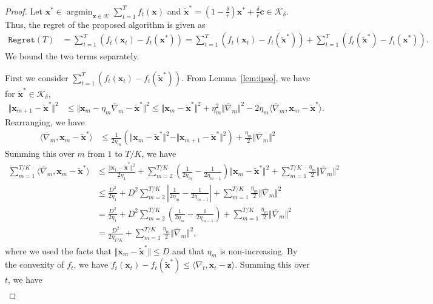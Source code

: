 \documentclass[twoside,11pt,]{article}
\newcommand{\op}[1]{\operatorname{#1}}
\newcommand{\C}[1]{\mathcal{#1}}
\newcommand{\BF}[1]{\mathbf{#1}}
\newcommand{\K}{\C{K}}
\newcommand{\x}{\BF{x}}
\newcommand{\xs}{\x^*}
\newcommand{\txs}{\tilde{\x}^*}
\newcommand{\z}{\BF{z}}
\newcommand{\sumT}{\sum\limits_{t=1}^T}
\newcommand{\bn}{\bar{\nabla}}
\begin{document}
\begin{proof}
Let $\xs\in \op{argmin}_{\x\in\K}\sum_{t=1}^T f_t(\x)$ and $\txs=(1-\frac{\delta}{r})\xs+\frac{\delta}{r}{\BF{c}} \in \K_\delta$.
Thus, the regret of the proposed algorithm is given as
\begin{align}
\label{eq:decomposeRegret}
\mathtt{Regret}(T) &= \sumT \left( f_t(\x_t) - f_t(\xs) \right) 
= \sumT \left( f_t(\x_t) - f_t(\txs) \right) + \sumT \left( f_t(\txs) - f_t(\xs) \right).
\end{align}
We bound the two terms separately.

First we consider $\sum_{t=1}^T \left( f_t(\x_t) - f_t(\txs) \right)$.
From Lemma~\ref{lem:ipso}, we have for $\txs \in \K_\delta$,
\begin{align*}
\Vert \x_{m+1}-\txs \Vert ^2 & \leq \Vert \x_m - \eta_m \bn_m -\txs \Vert ^2 
\leq \Vert \x_m - \txs \Vert ^2 + \eta_m^2 \Vert \bn_m \Vert^2 - 2\eta_m \langle \bn_m, \x_m - \txs \rangle.
\end{align*}
Rearranging, we have
\begin{align}
\langle \bn_m, \x_m - \txs \rangle 
&\leq \frac{1}{2\eta_m} (\Vert \x_m - \txs \Vert ^2- \Vert \x_{m+1}-\txs \Vert ^2) 
+ \frac{\eta_m}{2} \Vert \bn_m \Vert^2
\end{align}
Summing this over $m$ from $1$ to $T/K$, we have
\begin{align*}
\sum\limits_{m=1}^{T/K} \langle \bn_m , \x_m - \txs \rangle  
&\leq \frac{\Vert \x_1 - \txs \Vert ^2}{2\eta_1} 
+ \sum\limits_{m=2}^{T/K} (\frac{1}{2\eta_m}-\frac{1}{2\eta_{m-1}}) \Vert \x_m - \txs \Vert ^2 
+ \sum\limits_{m=1}^{T/K} \frac{\eta_m}{2} \Vert \bn_m \Vert^2 \\
&\leq \frac{D^2}{2\eta_1} 
+ D^2 \sum\limits_{m=2}^{T/K} \left| \frac{1}{2\eta_m}-\frac{1}{2\eta_{m-1}} \right| 
+ \sum\limits_{m=1}^{T/K} \frac{\eta_m}{2} \Vert \bn_m \Vert^2 \\
&= \frac{D^2}{2\eta_1} 
+ D^2 \sum\limits_{m=2}^{T/K} \left( \frac{1}{2\eta_m}-\frac{1}{2\eta_{m-1}} \right) 
+ \sum\limits_{m=1}^{T/K} \frac{\eta_m}{2} \Vert \bn_m \Vert^2 \\
&= \frac{D^2}{2\eta_{T/K}}
+ \sum\limits_{m=1}^{T/K} \frac{\eta_m}{2} \Vert \bn_m \Vert^2,
\end{align*}
where we used the facts that $\Vert \x_m - \txs \Vert \leq D$ and that $\eta_m$ is non-increasing.
By the convexity of $f_t$, we have $f_t (\x_t) - f_t(\txs) \leq \langle \nabla_t, \x_t - \z \rangle$. Summing this over $t$, we have
\begin{align}
\label{eq:xt2txs}

\end{align}
\end{proof}
\end{document}
